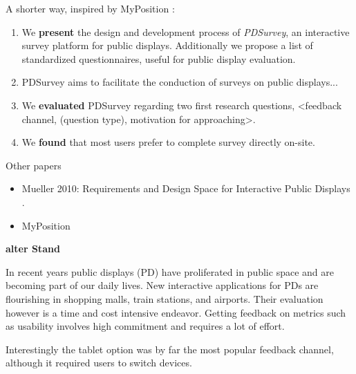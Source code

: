 	A shorter way, inspired by MyPosition \cite{valkanova2014myposition}:
	\begin{enumerate}
	\item We \textbf{present} the design and development process of \textit{PDSurvey}, an interactive survey platform for public displays. Additionally we propose a list of standardized questionnaires, useful for public display evaluation.
	\item PDSurvey aims to facilitate the conduction of surveys on public displays...
	\item We \textbf{evaluated} PDSurvey regarding two first research questions, <feedback channel, (question type), motivation for approaching>.
	\item We \textbf{found} that most users prefer to complete survey directly on-site.
	\end{enumerate}

	Other papers
	\begin{itemize}
	\item Mueller 2010: Requirements and Design Space for Interactive Public Displays \cite{muller2010requirements}.
	\item MyPosition \cite{valkanova2014myposition}
	\end{itemize}


\textbf{alter Stand}

	In recent years public displays (PD) have proliferated in public space and are becoming part of our daily lives. New interactive applications for PDs are flourishing in shopping malls, train stations, and airports. Their evaluation however is a time and cost intensive endeavor. 
	Getting feedback on metrics such as usability involves high commitment and requires a lot of effort.

	Interestingly the tablet option was by far the most popular feedback channel, although it required users to switch devices. 

